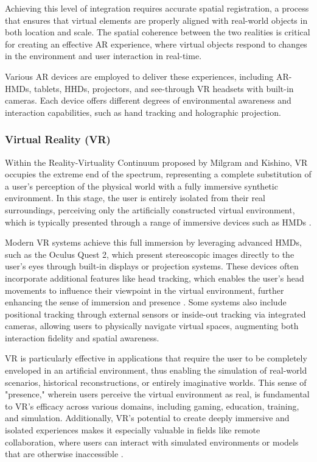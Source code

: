     Achieving this level of integration requires accurate spatial registration, a process that ensures that virtual elements are properly aligned with real-world objects in both location and scale. The spatial coherence between the two realities is critical for creating an effective \ac{AR} experience, where virtual objects respond to changes in the environment and user interaction in real-time.

    Various \ac{AR} devices are employed to deliver these experiences, including \ac{AR}-\ac{HMDs}, tablets, \ac{HHDs}, projectors, and see-through \ac{VR} headsets with built-in cameras. Each device offers different degrees of environmental awareness and interaction capabilities, such as hand tracking and holographic projection. 


\subsubsection{Virtual Reality (\ac{VR})}
    
    Within the Reality-Virtuality Continuum proposed by Milgram and Kishino, \ac{VR} occupies the extreme end of the spectrum, representing a complete substitution of a user’s perception of the physical world with a fully immersive synthetic environment. In this stage, the user is entirely isolated from their real surroundings, perceiving only the artificially constructed virtual environment, which is typically presented through a range of immersive devices such as \ac{HMDs} \cite{milgram1994}.

    Modern \ac{VR} systems achieve this full immersion by leveraging advanced \ac{HMDs}, such as the Oculus Quest 2, which present stereoscopic images directly to the user’s eyes through built-in displays or projection systems. These devices often incorporate additional features like head tracking, which enables the user’s head movements to influence their viewpoint in the virtual environment, further enhancing the sense of immersion and presence \cite{whatismixedreality}. Some systems also include positional tracking through external sensors or inside-out tracking via integrated cameras, allowing users to physically navigate virtual spaces, augmenting both interaction fidelity and spatial awareness.

    \ac{VR} is particularly effective in applications that require the user to be completely enveloped in an artificial environment, thus enabling the simulation of real-world scenarios, historical reconstructions, or entirely imaginative worlds. This sense of "presence," wherein users perceive the virtual environment as real, is fundamental to \ac{VR}'s efficacy across various domains, including gaming, education, training, and simulation. Additionally, \ac{VR}'s potential to create deeply immersive and isolated experiences makes it especially valuable in fields like remote collaboration, where users can interact with simulated environments or models that are otherwise inaccessible \cite{8712803}.

